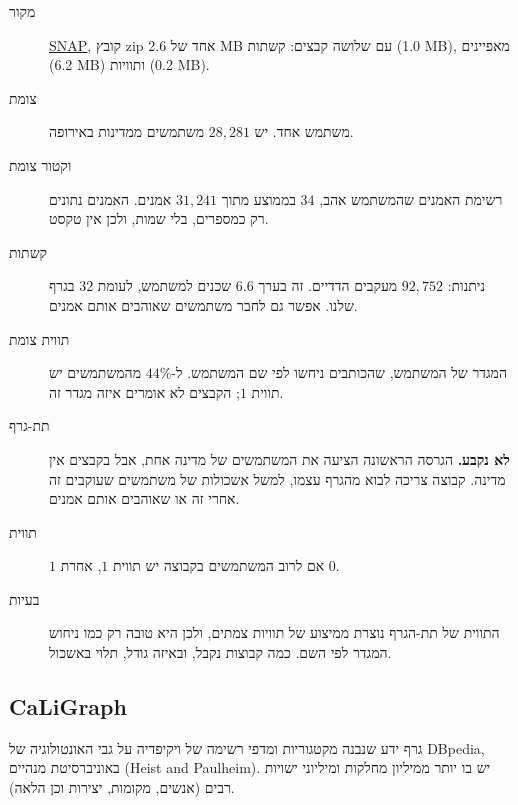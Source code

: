 \documentclass[11pt]{article}
\newcommand{\en}[1]{\foreignlanguage{english}{#1}}
\begin{document}
\begin{description}
\item[מקור] \href{https://snap.stanford.edu/data/feather-deezer-social.html}{\en{SNAP}}, קובץ
\en{zip} אחד של \en{2.6 MB} עם שלושה קבצים: קשתות (\en{1.0 MB}), מאפיינים (\en{6.2 MB}) ותוויות
(\en{0.2 MB}).
\item[צומת] משתמש אחד. יש $28{,}281$ משתמשים ממדינות באירופה.
\item[וקטור צומת] רשימת האמנים שהמשתמש אהב, $34$ בממוצע מתוך $31{,}241$ אמנים. האמנים נתונים
רק כמספרים, בלי שמות, ולכן אין טקסט.
\item[קשתות] ניתנות: $92{,}752$ מעקבים הדדיים. זה בערך $6.6$ שכנים למשתמש, לעומת $32$ בגרף שלנו.
אפשר גם לחבר משתמשים שאוהבים אותם אמנים.
\item[תווית צומת] המגדר של המשתמש, שהכותבים ניחשו לפי שם המשתמש. ל-$44\%$ מהמשתמשים יש תווית
$1$; הקבצים לא אומרים איזה מגדר זה.
\item[תת-גרף] \textbf{לא נקבע.} הגרסה הראשונה הציעה את המשתמשים של מדינה אחת, אבל בקבצים אין
מדינה. קבוצה צריכה לבוא מהגרף עצמו, למשל אשכולות של משתמשים שעוקבים זה אחרי זה או שאוהבים
אותם אמנים.
\item[תווית] $1$ אם לרוב המשתמשים בקבוצה יש תווית $1$, אחרת $0$.
\item[בעיות] התווית של תת-הגרף נוצרת ממיצוע של תוויות צמתים, ולכן היא טובה רק כמו ניחוש המגדר
לפי השם. כמה קבוצות נקבל, ובאיזה גודל, תלוי באשכול.
\end{description}

\subsection*{\en{CaLiGraph}}

גרף ידע שנבנה מקטגוריות ומדפי רשימה של ויקיפדיה על גבי האונטולוגיה של \en{DBpedia}, באוניברסיטת
מנהיים (\en{Heist and Paulheim}). יש בו יותר ממיליון מחלקות ומיליוני ישויות רבים (אנשים, מקומות,
יצירות וכן הלאה).
\end{document}
